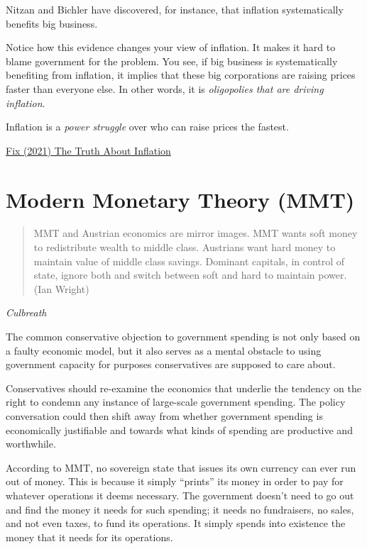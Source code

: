 \documentclass[
]{book}
\begin{document}
Nitzan and Bichler have discovered, for instance, that inflation systematically benefits big business.

Notice how this evidence changes your view of inflation. It makes it hard to blame government for the problem. You see, if big business is systematically benefiting from inflation, it implies that these big corporations are raising prices faster than everyone else. In other words, it is \emph{oligopolies that are driving inflation}.

Inflation is a \emph{power struggle} over who can raise prices the fastest.

\href{https://economicsfromthetopdown.com/2021/11/24/the-truth-about-inflation/}{Fix (2021) The Truth About Inflation}

\hypertarget{modern-monetary-theory-mmt}{%
\section{Modern Monetary Theory (MMT)}\label{modern-monetary-theory-mmt}}

\begin{quote}
MMT and Austrian economics are mirror images. MMT wants soft money to redistribute wealth to middle class. Austrians want hard money to maintain value of middle class savings. Dominant capitals, in control of state, ignore both and switch between soft and hard to maintain power. (Ian Wright)
\end{quote}

\emph{Culbreath}

The common conservative objection to government spending is not only based on a faulty economic model, but it also serves as a mental obstacle to using government capacity for purposes conservatives are supposed to care about.

Conservatives should re-examine the economics that underlie the tendency on the right to condemn any instance of large-scale government spending.
The policy conversation could then shift away from whether government spending is economically justifiable and towards what kinds of spending are productive and worthwhile.

According to MMT, no sovereign state that issues its own currency can ever run out of money. This is because it simply ``prints'' its money in order to pay for whatever operations it deems necessary. The government doesn't need to go out and find the money it needs for such spending; it needs no fundraisers, no sales, and not even taxes, to fund its operations. It simply spends into existence the money that it needs for its operations.
\end{document}
